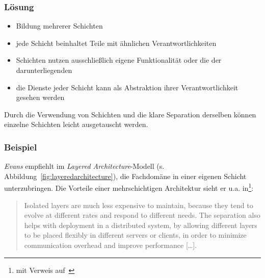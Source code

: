 \subsubsection*{Lösung}

\begin{itemize}
    \item Bildung mehrerer Schichten
    \item jede Schicht beinhaltet Teile mit ähnlichen Verantwortlichkeiten
    \item Schichten nutzen ausschließlich eigene Funktionalität oder die der darunterliegenden
    \item die Dienste jeder Schicht kann als Abstraktion ihrer Verantwortlichkeit gesehen werden
\end{itemize}

\noindent
Durch die Verwendung von Schichten und die klare Separation derselben können einzelne Schichten leicht ausgetauscht werden.

\subsubsection*{Beispiel}
\textit{Evans} empfiehlt im \textit{Layered Architecture}-Modell (s. Abbildung~\ref{fig:layeredarchitecture}), die Fachdomäne in einer eigenen Schicht unterzubringen.
Die Vorteile einer mehrschichtigen Architektur sieht er u.a. in\footnote{
mit Verweis auf~\cite{Fow96}
}:

\blockquote[{\cite[71]{Eva03}}]{
Isolated layers are much less expensive to maintain, because they tend to evolve at different rates and respond to different needs. The separation also helps with deployment in a distributed system, by allowing different layers to be placed flexibly in different servers or clients, in order to minimize communication overhead and improve performance [\ldots].
}

